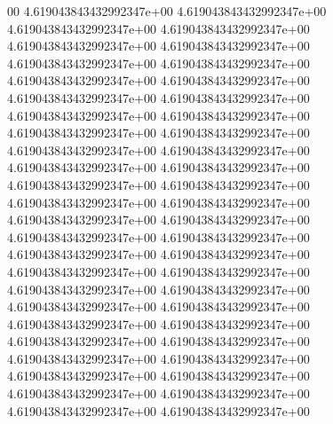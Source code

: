 00	4.619043843432992347e+00	4.619043843432992347e+00	4.619043843432992347e+00	4.619043843432992347e+00	4.619043843432992347e+00	4.619043843432992347e+00	4.619043843432992347e+00	4.619043843432992347e+00	4.619043843432992347e+00	4.619043843432992347e+00	4.619043843432992347e+00	4.619043843432992347e+00	4.619043843432992347e+00	4.619043843432992347e+00	4.619043843432992347e+00	4.619043843432992347e+00	4.619043843432992347e+00	4.619043843432992347e+00	4.619043843432992347e+00	4.619043843432992347e+00	4.619043843432992347e+00	4.619043843432992347e+00	4.619043843432992347e+00	4.619043843432992347e+00	4.619043843432992347e+00	4.619043843432992347e+00	4.619043843432992347e+00	4.619043843432992347e+00	4.619043843432992347e+00	4.619043843432992347e+00	4.619043843432992347e+00	4.619043843432992347e+00	4.619043843432992347e+00	4.619043843432992347e+00	4.619043843432992347e+00	4.619043843432992347e+00	4.619043843432992347e+00	4.619043843432992347e+00	4.619043843432992347e+00	4.619043843432992347e+00	4.619043843432992347e+00	4.619043843432992347e+00	4.619043843432992347e+00	4.619043843432992347e+00	4.619043843432992347e+00	4.619043843432992347e+00	4.619043843432992347e+00	4.619043843432992347e+00
